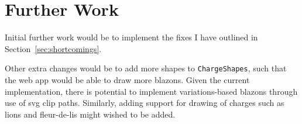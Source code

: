 \documentclass[nobib, a4paper, twoside, justified]{tufte-book}
\makeatletter
\newcommand{\svg}{\gls{svg}\@\xspace}
\newcommand{\charges}{\glspl{charge}\@\xspace}
\newcommand{\blazons}{\glspl{blazon}\@\xspace}
\makeatother
\begin{document}
\section{Further Work}%
\label{sec:further_work}

Initial further work would be to implement the fixes I have outlined in Section~\ref{sec:shortcomings}.

Other extra changes would be to add more shapes to \texttt{ChargeShapes}, such that the web app
would be able to draw more \blazons. Given the current implementation, there is potential to
implement \glspl{variation}-based \blazons through use of \svg clip paths. Similarly, adding
support for drawing of \charges such as lions and fleur-de-lis might wished to be added.

\backmatter%

\printbibliography[heading=bibintoc]

\printglossary%


\end{document}
